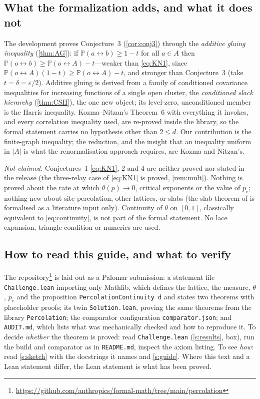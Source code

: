 \documentclass[11pt]{article}
\theoremstyle{definition}
\theoremstyle{remark}
\newcommand{\PP}{\mathbb{P}}
\newcommand{\pc}{p_{\mathrm c}}
\newcommand{\con}{\leftrightarrow}
\begin{document}
\subsection{What the formalization adds, and what it does not}\label{ss:adds}
The development proves Conjecture~3 (\cref{cor:conj3}) through the \emph{additive gluing inequality} (\cref{thm:AG}): if
$\PP(a\con b)\ge1-t$ for all $a\in A$ then $\PP(o\con b)\ge\PP(o\con A)-t$---weaker than \eqref{eq:KN1}, since
$\PP(o\con A)(1-t)\ge\PP(o\con A)-t$, and stronger than Conjecture~3 (take $t=\delta=\varepsilon/2$).  Additive gluing is derived from a family
of conditioned covariance inequalities for increasing functions of a single open cluster, the \emph{conditioned slack hierarchy}
(\cref{thm:CSH}), the one new object; its level-zero, unconditioned member is the Harris inequality.  Kozma--Nitzan's Theorem~6 with everything
it invokes, and every correlation inequality used, are re-proved inside the library, so the formal statement carries no hypothesis other than
$2\le d$.  Our contribution is the finite-graph inequality; the reduction, and the insight that an inequality uniform in $|A|$ is what the
renormalisation approach requires, are Kozma and Nitzan's.

\emph{Not claimed.}  Conjectures~1 \eqref{eq:KN1}, 2 and 4 are neither proved nor stated in the release (the three-relay case of
\eqref{eq:KN1} is proved, \cref{rem:mult}).  Nothing is proved about the rate at which $\theta(p)\to0$, critical exponents or the value of
$\pc$; nothing new about site percolation, other lattices, or slabs (the slab theorem of \citep{DuminilCopinSidoraviciusTassion2016} is
formalised as a literature input only).  Continuity of $\theta$ on $[0,1]$, classically equivalent to \eqref{eq:continuity}, is not part of
the formal statement.  No lace expansion, triangle condition or numerics are used.

\subsection{How to read this guide, and what to verify}\label{ss:howto}
The repository\footnote{\url{https://github.com/anthropics/formal-math/tree/main/percolation}} is laid out as a Palomar submission: a
statement file \texttt{Challenge.lean} importing only Mathlib, which defines the lattice, the measure, $\theta$, $\pc$ and the
proposition \texttt{PercolationContinuity d} and states two theorems with placeholder proofs; its twin \texttt{Solution.lean}, proving
the same theorems from the library \texttt{Percolation}; the comparator configuration \texttt{comparator.json}; and \texttt{AUDIT.md},
which lists what was mechanically checked and how to reproduce it.  To decide \emph{whether} the theorem is proved: read \texttt{Challenge.lean} (\cref{s:results}, box), run the build and comparator
as in \texttt{README.md}, inspect the axiom listing.  To see \emph{how}: read \cref{s:sketch} with the docstrings it names and \cref{s:guide}.
Where this text and a Lean statement differ, the Lean statement is what has been proved.
\end{document}
